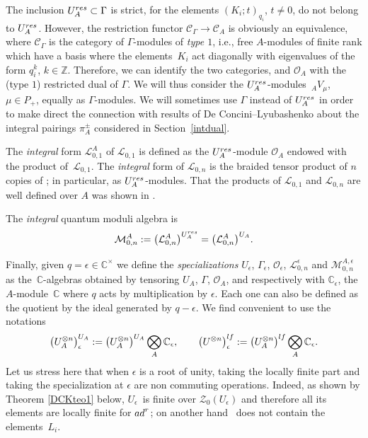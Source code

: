 \documentclass[11pt]{article}
\numberwithin{equation}{section}
\numberwithin{equation}{section}
\theoremstyle{definition}
\newcommand{\e}{\epsilon}
\newcommand{\mc}{\mathbb{C}}
\newcommand{\mz}{\mathbb{Z}}
\newcommand{\Ll}{{\mathcal L}}
\newcommand{\Mm}{{\mathcal M}}
\newcommand{\Oo}{{\mathcal O}}
\newcommand{\ra}{\rightarrow}
\begin{document}
The inclusion $U_A^{\rm res}\subset \Gamma$ is strict, for the elements $(K_i; t)_{q_i}$, $t\ne 0$, do not belong to $U_A^{\rm res}$. However, the restriction functor $\mathcal{C}_\Gamma \ra\mathcal{C}_A$ is obviously an equivalence, where $\mathcal{C}_\Gamma$ is the category of $\Gamma$-modules of {\it type $1$}, i.e., free $A$-modules of finite rank which have a basis where the elements~$K_i$ act diagonally with eigenvalues of the form $q_i^k$, $k\in \mz$. Therefore, we can identify the two categories, and $\Oo_A$ with the (type $1$) restricted dual of $\Gamma$. We will thus consider the $U_A^{\rm res}$-modules~${}_AV_\mu$, $\mu\in P_+$, equally as $\Gamma$-modules. We will sometimes use $\Gamma$ instead of $U_A^{\rm res}$ in order to make direct the connection with results of De Concini--Lyubashenko about the integral pairings $\pi_A^\pm$ considered in Section~\ref{intdual}.

The {\it integral} form $\Ll_{0,1}^A$ of $\Ll_{0,1}$ is defined as the $U_A^{\rm res}$-module $\Oo_A$ endowed with the product of~$\Ll_{0,1}$. The {\it integral} form \smash{$\Ll_{0,n}^A$} of $\Ll_{0,n}$ is the braided tensor product of $n$ copies of \smash{$\Ll_{0,1}^A$}; in particular, \smash{$\Ll_{0,n}^A = \Oo_A^{\otimes n}$} as $U_A^{\rm res}$-modules. That the products of $\Ll_{0,1}$ and $\Ll_{0,n}$ are well defined over $A$ was shown in \cite[Proposition~6.9]{BR}.

The {\it integral} quantum moduli algebra is
\[\Mm_{0,n}^A := \big(\Ll_{0,n}^A\big)^{U_A^{\rm res}} = \big(\Ll_{0,n}^A\big)^{U_A}.\]

Finally, given $q=\e\in \mc^{\times}$ we define the {\it specializations} $U_\e$, $\Gamma_\e$, $\Oo_\e$, $\Ll_{0,n}^{\e}$ and $\Mm_{0,n}^{A,\e}$ as the~$\mc$-algebras obtained by tensoring $U_A$, $\Gamma$, $\Oo_A$, \smash{$\Ll_{0,n}^A$} and \smash{$\Mm_{0,n}^A$} respectively with $\mc_\e$, the $A$-module~$\mc$ where $q$ acts by multiplication by $\e$. Each one can also be defined as the quotient by the ideal generated by $q-\e$. We find convenient to use the notations
\begin{equation}\label{notambig0}
\big(U_A^{\otimes n}\big)^{U_A}_\e:= \big(U_A^{\otimes n}\big)^{U_A}\bigotimes_A \mc_\e,\qquad \big(U^{\otimes n}\big)^{\rm lf}_\e:= \big(U_A^{\otimes n}\big)^{\rm lf}\bigotimes_A \mc_\e .
\end{equation}
Let us stress here that when $\e$ is a root of unity, taking the locally finite part and taking the specialization at $\e$ are non commuting operations. Indeed, as shown by Theorem \ref{DCKteo1} below, $U_\e$~is finite over $\mathcal{Z}_0(U_\e)$ and therefore all its elements are locally finite for ${\rm ad}^r$; on another hand~\smash{${U_\e^{\rm lf} = U_A^{\rm lf}\bigotimes_A \mc_\e}$} does not contain the elements~$L_i$.
\end{document}
